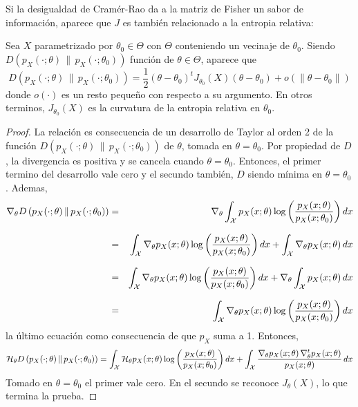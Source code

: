 Si  la  desigualdad de  Cram\'er-Rao  da  a la  matriz  de  Fisher  un sabor  de
informaci\'on, aparece que $J$ es tambi\'en relacionado a la entropia relativa:
%
\begin{teorema}
  Sea $X$  parametrizado por $\theta_0  \in \Theta$ con $\Theta$  conteniendo un
  vecinaje  de   $\theta_0$.   Siendo   $D\left(  p_X(\cdot;\theta)  \,   \|  \,
    p_X(\cdot;\theta_0)  \right)$  funci\'on  de  $\theta \in  \Theta$,  aparece
  que
  \[
  D  \left( p_X(\cdot;\theta)  \, \|  \, p_X(\cdot;\theta_0)  \right)  = \frac12
  \left( \theta  - \theta_0 \right)^t  J_{\theta_0}(X) \left( \theta  - \theta_0
  \right) + o\left( \| \theta - \theta_0 \|\right)
  \]
  donde $o(\cdot)$ es un resto peque\~no  con respecto a su argumento.  En otros
  terminos,  $J_{\theta_0}(X)$  es  la  curvatura  de la  entropia  relativa  en
  $\theta_0$.
\end{teorema}
%
\begin{proof}
  La relaci\'on  es consecuencia  de un desarrollo  de Taylor  al orden 2  de la
  funci\'on $D\left( p_X(\cdot;\theta) \,  \| \, p_X(\cdot;\theta_0) \right)$ de
  $\theta$, tomada en $\theta =  \theta_0$. Por propiedad de $D$, la divergencia
  es  positiva y  se cancela  cuando $\theta  = \theta_0$.  Entonces,  el primer
  termino del desarrollo  vale cero y el secundo  tambi\'en, $D$ siendo m\'inima
  en $\theta = \theta_0$. Ademas,
  \begin{eqnarray*}
  \nabla_\theta D\left( p_X(\cdot;\theta) \, \| \, p_X(\cdot;\theta_0) \right) & =
  & \nabla_\theta \int_{\mathcal{X}} p_X(x;\theta) \log \left(
  \frac{p_X(x;\theta)}{p_X(x;\theta_0)} \right) dx\\[2.5mm]
  & = & \int_{\mathcal{X}} \nabla_\theta p_X(x;\theta) \log \left(
  \frac{p_X(x;\theta)}{p_X(x;\theta_0)} \right) dx + \int_{\mathcal{X}} \nabla_\theta
  p_X(x;\theta) \, dx\\[2.5mm]
  & = & \int_{\mathcal{X}} \nabla_\theta p_X(x;\theta) \log \left(
  \frac{p_X(x;\theta)}{p_X(x;\theta_0)} \right) dx + \nabla_\theta \int_{\mathcal{X}}
  p_X(x;\theta) \, dx\\[2.5mm]
  & = & \int_{\mathcal{X}} \nabla_\theta p_X(x;\theta) \log \left(
  \frac{p_X(x;\theta)}{p_X(x;\theta_0)} \right) dx
  \end{eqnarray*}
  la \'ultimo ecuaci\'on como consecuencia de que $p_X$ suma a 1.  Entonces,
  \[
  \mathcal{H}_\theta D\left( p_X(\cdot;\theta) \,  \| \, p_X(\cdot;\theta_0) \right) =
  \int_{\mathcal{X}}         \mathcal{H}_\theta         p_X(x;\theta)         \log         \left(
    \frac{p_X(x;\theta)}{p_X(x;\theta_0)}      \right)     dx      +     \int_{\mathcal{X}}
  \frac{\nabla_\theta          p_X(x;\theta)          \,         \nabla^t_\theta
    p_X(x;\theta)}{p_X(x;\theta)} \, dx
  \]
  Tomado en $\theta = \theta_0$ el  primer vale cero.  En el secundo se reconoce
  $J_\theta(X)$, lo que termina la prueba.
\end{proof}
